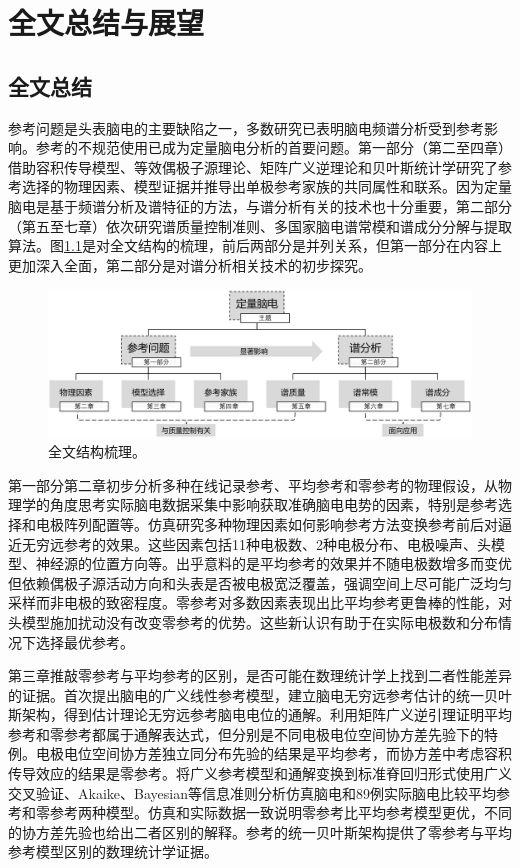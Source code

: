 \chapter{全文总结与展望}
\section{全文总结}
参考问题是头表脑电的主要缺陷之一，多数研究已表明脑电频谱分析受到参考影响。参考的不规范使用已成为定量脑电分析的首要问题。第一部分（第二至四章）借助容积传导模型、等效偶极子源理论、矩阵广义逆理论和贝叶斯统计学研究了参考选择的物理因素、模型证据并推导出单极参考家族的共同属性和联系。因为定量脑电是基于频谱分析及谱特征的方法，与谱分析有关的技术也十分重要，第二部分（第五至七章）依次研究谱质量控制准则、多国家脑电谱常模和谱成分分解与提取算法。图\ref{8:sum}是对全文结构的梳理，前后两部分是并列关系，但第一部分在内容上更加深入全面，第二部分是对谱分析相关技术的初步探究。
\begin{figure}[!h]
\includegraphics[width=\linewidth]{pic/sum/sum.png}
\caption{全文结构梳理。}
\label{8:sum}
\end{figure}

第一部分第二章初步分析多种在线记录参考、平均参考和零参考的物理假设，从物理学的角度思考实际脑电数据采集中影响获取准确脑电电势的因素，特别是参考选择和电极阵列配置等。仿真研究多种物理因素如何影响参考方法变换参考前后对逼近无穷远参考的效果。这些因素包括11种电极数、2种电极分布、电极噪声、头模型、神经源的位置方向等。出乎意料的是平均参考的效果并不随电极数增多而变优但依赖偶极子源活动方向和头表是否被电极宽泛覆盖，强调空间上尽可能广泛均匀采样而非电极的致密程度。零参考对多数因素表现出比平均参考更鲁棒的性能，对头模型施加扰动没有改变零参考的优势。这些新认识有助于在实际电极数和分布情况下选择最优参考。

第三章推敲零参考与平均参考的区别，是否可能在数理统计学上找到二者性能差异的证据。首次提出脑电的广义线性参考模型，建立脑电无穷远参考估计的统一贝叶斯架构，得到估计理论无穷远参考脑电电位的通解。利用矩阵广义逆引理证明平均参考和零参考都属于通解表达式，但分别是不同电极电位空间协方差先验下的特例。电极电位空间协方差独立同分布先验的结果是平均参考，而协方差中考虑容积传导效应的结果是零参考。将广义参考模型和通解变换到标准脊回归形式使用广义交叉验证、Akaike、Bayesian等信息准则分析仿真脑电和89例实际脑电比较平均参考和零参考两种模型。仿真和实际数据一致说明零参考比平均参考模型更优，不同的协方差先验也给出二者区别的解释。参考的统一贝叶斯架构提供了零参考与平均参考模型区别的数理统计学证据。


